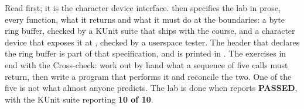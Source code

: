 Read  first; it is the character device interface.  then
specifies the lab in prose, every function, what it returns and what it must do at the boundaries:
a byte ring buffer, checked by a KUnit suite that ships with the course, and a character device
that exposes it at , checked by a userspace tester. The header that declares the
ring buffer is part of that specification, and is printed in . The exercises in
 end with the Cross-check: work out by hand what a sequence of five calls
must return, then write a program that performs it and reconcile the two. One of the five is not
what almost anyone predicts. The lab is done when  reports \textbf{PASSED},
with the KUnit suite reporting \textbf{10 of 10}.





